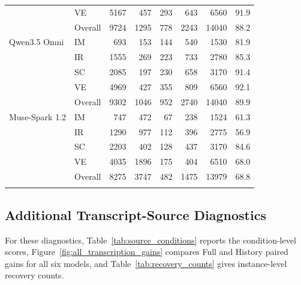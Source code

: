 \begin{table}[htbp]
\begin{tabular*}{\linewidth}{@{}l@{\hspace{6pt}}l@{\extracolsep{\fill}}rrrrrr@{}}
 & VE & 5167 & 457 & 293 & 643 & 6560 & 91.9 \\
 & Overall & 9724 & 1295 & 778 & 2243 & 14040 & 88.2 \\
\addlinespace[3pt]
Qwen3.5 Omni & IM & 693 & 153 & 144 & 540 & 1530 & 81.9 \\
 & IR & 1555 & 269 & 223 & 733 & 2780 & 85.3 \\
 & SC & 2085 & 197 & 230 & 658 & 3170 & 91.4 \\
 & VE & 4969 & 427 & 355 & 809 & 6560 & 92.1 \\
 & Overall & 9302 & 1046 & 952 & 2740 & 14040 & 89.9 \\
\addlinespace[3pt]
Muse-Spark 1.2 & IM & 747 & 472 & 67 & 238 & 1524 & 61.3 \\
 & IR & 1290 & 977 & 112 & 396 & 2775 & 56.9 \\
 & SC & 2203 & 402 & 128 & 437 & 3170 & 84.6 \\
 & VE & 4035 & 1896 & 175 & 404 & 6510 & 68.0 \\
 & Overall & 8275 & 3747 & 482 & 1475 & 13979 & 68.8 \\
\addlinespace[3pt]
\bottomrule
\end{tabular*}
\endgroup
\end{table}


\subsection{Additional Transcript-Source Diagnostics}

\label{app:transcript_sources}



For these diagnostics, Table~\ref{tab:source_conditions} reports the condition-level scores, Figure~\ref{fig:all_transcription_gains} compares Full and History paired gains for all six models, and Table~\ref{tab:recovery_counts} gives instance-level recovery counts.



